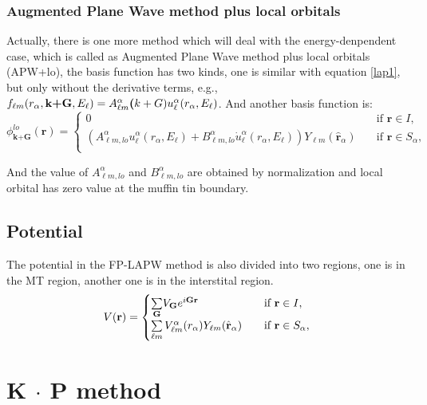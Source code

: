 \documentclass[a4paper, 12pt, titlepage,oneside,drop]{kthesis}
\begin{document}
\subsection{Augmented Plane Wave method plus local orbitals}
\noindent Actually, there is one more method which will deal with the energy-denpendent case, which is called as Augmented Plane Wave method plus local orbitals (APW+lo), the 
basis function has two kinds, one is similar with equation \ref{lap1}, but only without the derivative terms, e.g., $f_{{\ell}{m}} (r_{\alpha},\textbf{k+G} ,E_{\ell}) =  A _{{\ell}m}^{\alpha} \textbf(k+G) u_{{\ell}}^{\alpha}(r_{\alpha}, E_{\ell})$.
And another basis function is:
\begin{equation*}\label{lap3}
\phi^{lo}_\textbf{k+G} (\textbf{r})= 
\begin{cases} 0 & \quad \mbox{if $\textbf{r} \in I, $}
\\
(A _{{\ell}m,lo}^{\alpha}  u_{{\ell}}^{\alpha}(r_{\alpha}, E_{\ell}) + B _{{\ell}m,lo}^{\alpha}  \dot{u}_{{\ell}}^{\alpha}(r_{\alpha}, E_{\ell}) ){Y_{{\ell}m}(\hat{\textbf{r}}_{\alpha})} & \quad \mbox{if $\textbf{r} \in S_\alpha, $}\\ 
\end{cases}
\end{equation*}
 
\noindent And the value of $A _{{\ell}m,lo}^{\alpha}$ and $B _{{\ell}m,lo}^{\alpha}$ are obtained by normalization and local orbital has zero value at the muffin tin boundary.


\section{Potential}

The potential in the FP-LAPW method is also divided into two regions, one is in the MT region, another one is in the interstital region.
\begin{equation*}\label{lap3}
V(\textbf{r})= 
\begin{cases} \sumg<{\textbf G}> V_{\textbf G} e^{i {\textbf G} {\textbf {r}  }} & \quad \mbox{if $\textbf{r} \in I, $}
\\
 \sum\limits_{{\ell}m} V_{{\ell}m}^{\alpha} (r_{\alpha}) Y_{{\ell}m}(\hat{{\textbf r}}_{\alpha})  & \quad \mbox{if $\textbf{r} \in S_\alpha, $}\\ 
\end{cases}
\end{equation*}


\chapter{K $\cdot$ P method}
\end{document}

